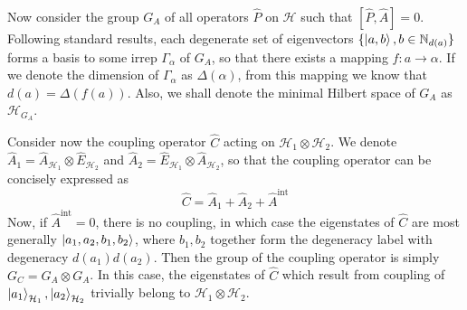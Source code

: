 \documentclass[12pt]{article}
\begin{document}
	Now consider the group $G_A$ of all operators $\hat{P}$ on $\mathcal{H}$ such that $[\hat{P},\hat{A}]=0$. Following standard results, each degenerate set of eigenvectors $\{\ket{a,b}, b\in\mathbb{N}_{d(a)}\}$ forms a basis to some irrep $\Gamma_{\alpha}$ of $G_A$, so that there exists a mapping $f:a\to\alpha$. If we denote the dimension of $\Gamma_{\alpha}$ as $\Delta(\alpha)$, from this mapping we know that $d(a)=\Delta(f(a))$. Also, we shall denote the minimal Hilbert space of $G_A$ as $\mathcal{H}_{G_A}$.
	
	Consider now the coupling operator $\hat{C}$ acting on $\mathcal{H}_1\otimes \mathcal{H}_2$. We denote $\hat{A}_1=\hat{A}_{\mathcal{H}_1}\otimes \hat{E}_{\mathcal{H}_2}$ and $\hat{A}_2=\hat{E}_{\mathcal{H}_1}\otimes\hat{A}_{\mathcal{H}_2}$, so that the coupling operator can be concisely expressed as
	$$\hat{C}=\hat{A}_1+\hat{A}_2+\hat{A}^{\text{int}}$$
	Now, if $\hat{A}^{\text{int}}=0$, there is no coupling, in which case the eigenstates of $\hat{C}$ are most generally $\ket{a_1, a_2, b_1, b_2}$, where $b_1,b_2$ together form the degeneracy label with degeneracy $d(a_1)d(a_2)$. Then the group of the coupling operator is simply $G_C=G_A\otimes G_A$. In this case, the eigenstates of $\hat{C}$ which result from coupling of $\ket{a_1}_{\mathcal{H}_1},\ket{a_2}_{\mathcal{H}_2}$ trivially belong to $\mathcal{H}_1\otimes\mathcal{H}_2$.
	
\end{document}
